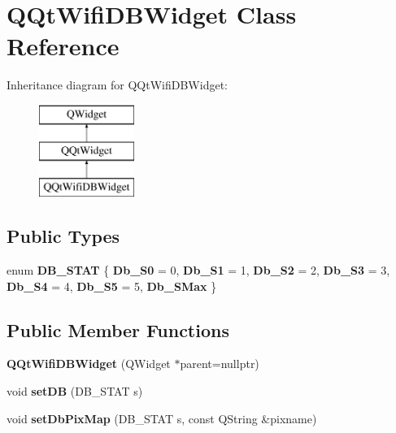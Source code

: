\hypertarget{class_q_qt_wifi_d_b_widget}{}\section{Q\+Qt\+Wifi\+D\+B\+Widget Class Reference}
\label{class_q_qt_wifi_d_b_widget}
Inheritance diagram for Q\+Qt\+Wifi\+D\+B\+Widget\+:\begin{figure}[H]
\begin{center}
\leavevmode
\includegraphics[height=3.000000cm]{class_q_qt_wifi_d_b_widget}
\end{center}
\end{figure}
\subsection*{Public Types}
\begin{DoxyCompactItemize}
\item 
\mbox{\label{class_q_qt_wifi_d_b_widget_ad4e41ca9d64999440742f515608dd878}} 
enum {\bfseries D\+B\+\_\+\+S\+T\+AT} \{ \newline
{\bfseries Db\+\_\+\+S0} = 0, 
{\bfseries Db\+\_\+\+S1} = 1, 
{\bfseries Db\+\_\+\+S2} = 2, 
{\bfseries Db\+\_\+\+S3} = 3, 
\newline
{\bfseries Db\+\_\+\+S4} = 4, 
{\bfseries Db\+\_\+\+S5} = 5, 
{\bfseries Db\+\_\+\+S\+Max}
 \}
\end{DoxyCompactItemize}
\subsection*{Public Member Functions}
\begin{DoxyCompactItemize}
\item 
\mbox{\label{class_q_qt_wifi_d_b_widget_a051e0c65e862a227d3bb2b7a9b9f5971}} 
{\bfseries Q\+Qt\+Wifi\+D\+B\+Widget} (Q\+Widget $\ast$parent=nullptr)
\item 
\mbox{\label{class_q_qt_wifi_d_b_widget_a5562084998193cb64fd07b3c966a8330}} 
void {\bfseries set\+DB} (D\+B\+\_\+\+S\+T\+AT s)
\item 
\mbox{\label{class_q_qt_wifi_d_b_widget_a08d567d29acfd8b3d50ded05e22bbe58}} 
void {\bfseries set\+Db\+Pix\+Map} (D\+B\+\_\+\+S\+T\+AT s, const Q\+String \&pixname)
\end{DoxyCompactItemize}
